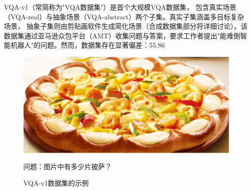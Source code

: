 VQA-v1\cite{Antol2015VQA}（常简称为"VQA数据集"）是首个大规模VQA数据集，
包含真实场景（VQA-real）与抽象场景（VQA-abstract）两个子集。真实子集涵盖多目标复杂场景，
抽象子集则由剪贴画软件生成简化场景（合成数据集部分将详细讨论）。该数据集通过亚马逊众包平台（AMT）收集问题与答案，要求工作者提出"能难倒智能机器人"的问题。然而，数据集存在显著偏差：55.86%
\begin{figure}[h]
    \centering
    \includegraphics[scale=0.4]{figures/example-from-vqa-v1.jpg}
    \begin{center}
        \footnotesize 问题：图片中有多少片披萨？
    \end{center}
    \caption{VQA-v1数据集的示例}
    \label{fig:example-from-vqa-v1}
\end{figure}

